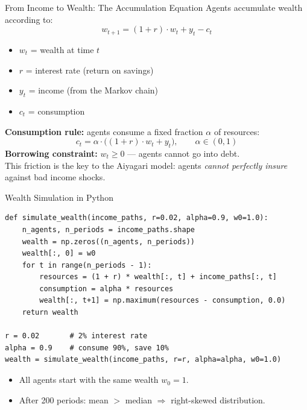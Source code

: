 \documentclass[aspectratio=169, 10pt]{beamer}
\begin{document}
\begin{frame}{From Income to Wealth: The Accumulation Equation}
Agents accumulate wealth according to:
\[
  w_{t+1} = (1 + r) \cdot w_t + y_t - c_t
\]
\begin{itemize}
  \item $w_t$ = wealth at time $t$
  \item $r$ = interest rate (return on savings)
  \item $y_t$ = income (from the Markov chain)
  \item $c_t$ = consumption
\end{itemize}
\vspace{0.5em}
\textbf{Consumption rule:} agents consume a fixed fraction $\alpha$ of resources:
\[
  c_t = \alpha \cdot \bigl((1+r) \cdot w_t + y_t\bigr), \qquad \alpha \in (0,1)
\]
\textbf{Borrowing constraint:} $w_t \geq 0$ --- agents cannot go into debt.\\[4pt]
This friction is the key to the Aiyagari model: agents \textit{cannot perfectly
insure} against bad income shocks.
\end{frame}

\begin{frame}[fragile]{Wealth Simulation in Python}
\begin{lstlisting}
def simulate_wealth(income_paths, r=0.02, alpha=0.9, w0=1.0):
    n_agents, n_periods = income_paths.shape
    wealth = np.zeros((n_agents, n_periods))
    wealth[:, 0] = w0
    for t in range(n_periods - 1):
        resources = (1 + r) * wealth[:, t] + income_paths[:, t]
        consumption = alpha * resources
        wealth[:, t+1] = np.maximum(resources - consumption, 0.0)
    return wealth

r = 0.02       # 2% interest rate
alpha = 0.9    # consume 90%, save 10%
wealth = simulate_wealth(income_paths, r=r, alpha=alpha, w0=1.0)
\end{lstlisting}
\vspace{0.3em}
\begin{itemize}
  \item All agents start with the same wealth $w_0 = 1$.
  \item After 200 periods: mean $>$ median $\Rightarrow$ \alert{right-skewed} distribution.
\end{itemize}
\end{frame}
\end{document}
